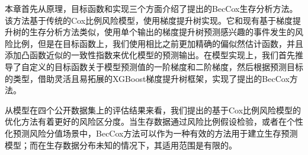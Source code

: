 本章首先从原理，目标函数和实现三个方面介绍了提出的BecCox生存分析方法。该方法基于传统的Cox比例风险模型，使用梯度提升树实现。它和现有基于梯度提升树的生存分析方法类似，使用单个输出的梯度提升树预测感兴趣的事件发生的风险比例，但是在目标函数上，我们使用相比之前更加精确的偏似然估计函数，并且添加凸函数近似的一致性指数来优化模型的预测输出。在模型实现上，我们首先推导了自定义的目标函数关于模型预测值的一阶梯度和二阶梯度，然后根据预测目标的类型，借助灵活且易拓展的XGBoost梯度提升树框架，实现了提出的BecCox方法。

从模型在四个公开数据集上的评估结果来看，我们提出的基于Cox比例风险模型的优化方法有着更好的风险区分度。当生存数据通过风险比例假设检验，或者在个性化预测风险分值场景中，BecCox方法可以作为一种有效的方法用于建立生存预测模型；而在生存数据分布未知的情况下，其适用范围是有限的。

